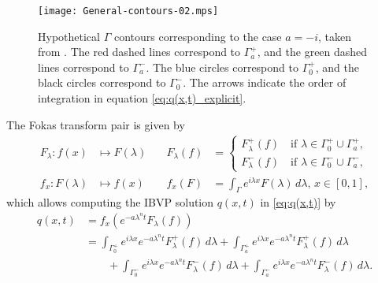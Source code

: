 \documentclass[12pt, oneside, a4paper]{article}
\begin{document}
\begin{figure}[htpb!]
    \centering
    \texttt{[image: General-contours-02.mps]}
    \caption{Hypothetical $\Gamma$ contours corresponding to the case $a=-i$, taken from \cite{Smith2016}. The red dashed lines correspond to $\Gamma_a^+$, and the green dashed lines correspond to $\Gamma_a^-$. The blue circles correspond to $\Gamma_0^+$, and the black circles correspond to $\Gamma_0^-$. The arrows indicate the order of integration in equation \eqref{eq:q(x,t)_explicit}.}
    \label{fig:gamma_smith_fokas}
\end{figure}

The Fokas transform pair is given by
\begin{subequations}\label{eq:fokas_transform_pair}
    \begin{alignat}{3}
        F_\lambda: f(x)&\mapsto F(\lambda)\quad &F_\lambda(f) &= \begin{cases}F^+_\lambda(f)\quad\mbox{if $\lambda\in \Gamma_0^+\cup \Gamma_a^+$},\\F^-_\lambda(f)\quad\mbox{if $\lambda\in \Gamma_0^-\cup \Gamma_a^-$},\end{cases} \label{eq:F_lambda}\\
        f_x:F(\lambda)&\mapsto f(x)\quad &f_x(F) &= \int_\Gamma e^{i\lambda x} F(\lambda)\,d\lambda,\, x\in [0,1], \label{eq:f_x}
    \end{alignat}
\end{subequations}
which allows computing the IBVP solution $q(x,t)$ in \eqref{eq:q(x,t)} by
\begin{equation}\label{eq:q(x,t)_explicit}
    \begin{split}
        q(x,t) &= f_x\left(e^{-a\lambda^n t}F_\lambda(f)\right)\\
        &= \int_{\Gamma_0^+}e^{i\lambda x}e^{-a\lambda^n t}F_\lambda^+(f)\,d\lambda + \int_{\Gamma_a^+}e^{i\lambda x}e^{-a\lambda^n t}F_\lambda^+(f)\,d\lambda\\
        &\qquad + \int_{\Gamma_0^-}e^{i\lambda x}e^{-a\lambda^n t}F_\lambda^-(f)\,d\lambda + \int_{\Gamma_a^-}e^{i\lambda x}e^{-a\lambda^n t}F_\lambda^-(f)\,d\lambda.
    \end{split}
\end{equation}

\end{document}
